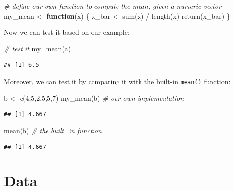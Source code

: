 \documentclass[
  12pt,
]{style/krantz}
\newenvironment{Shaded}{\begin{snugshade}}{\end{snugshade}}
\newcommand{\CommentTok}[1]{\textcolor[rgb]{0.56,0.35,0.01}{\textit{#1}}}
\newcommand{\ControlFlowTok}[1]{\textcolor[rgb]{0.13,0.29,0.53}{\textbf{#1}}}
\newcommand{\DecValTok}[1]{\textcolor[rgb]{0.00,0.00,0.81}{#1}}
\newcommand{\FunctionTok}[1]{\textcolor[rgb]{0.00,0.00,0.00}{#1}}
\newcommand{\NormalTok}[1]{#1}
\newcommand{\OtherTok}[1]{\textcolor[rgb]{0.56,0.35,0.01}{#1}}
\newcommand{\SpecialCharTok}[1]{\textcolor[rgb]{0.00,0.00,0.00}{#1}}
\begin{document}
\begin{Shaded}
\begin{Highlighting}[]
\CommentTok{\# define our own function to compute the mean, given a numeric vector}
\NormalTok{my\_mean }\OtherTok{\textless{}{-}} \ControlFlowTok{function}\NormalTok{(x) \{}
\NormalTok{     x\_bar }\OtherTok{\textless{}{-}} \FunctionTok{sum}\NormalTok{(x) }\SpecialCharTok{/} \FunctionTok{length}\NormalTok{(x)}
     \FunctionTok{return}\NormalTok{(x\_bar)}
\NormalTok{\}}
\end{Highlighting}
\end{Shaded}

Now we can test it based on our example:

\begin{Shaded}
\begin{Highlighting}[]
\CommentTok{\# test it}
\FunctionTok{my\_mean}\NormalTok{(a)}
\end{Highlighting}
\end{Shaded}

\begin{verbatim}
## [1] 6.5
\end{verbatim}

Moreover, we can test it by comparing it with the built-in \texttt{mean()} function:

\begin{Shaded}
\begin{Highlighting}[]
\NormalTok{b }\OtherTok{\textless{}{-}} \FunctionTok{c}\NormalTok{(}\DecValTok{4}\NormalTok{,}\DecValTok{5}\NormalTok{,}\DecValTok{2}\NormalTok{,}\DecValTok{5}\NormalTok{,}\DecValTok{5}\NormalTok{,}\DecValTok{7}\NormalTok{)}
\FunctionTok{my\_mean}\NormalTok{(b) }\CommentTok{\# our own implementation}
\end{Highlighting}
\end{Shaded}

\begin{verbatim}
## [1] 4.667
\end{verbatim}

\begin{Shaded}
\begin{Highlighting}[]
\FunctionTok{mean}\NormalTok{(b) }\CommentTok{\# the built\_in function}
\end{Highlighting}
\end{Shaded}

\begin{verbatim}
## [1] 4.667
\end{verbatim}

\hypertarget{data}{%
\chapter{Data}\label{data}}
\end{document}

